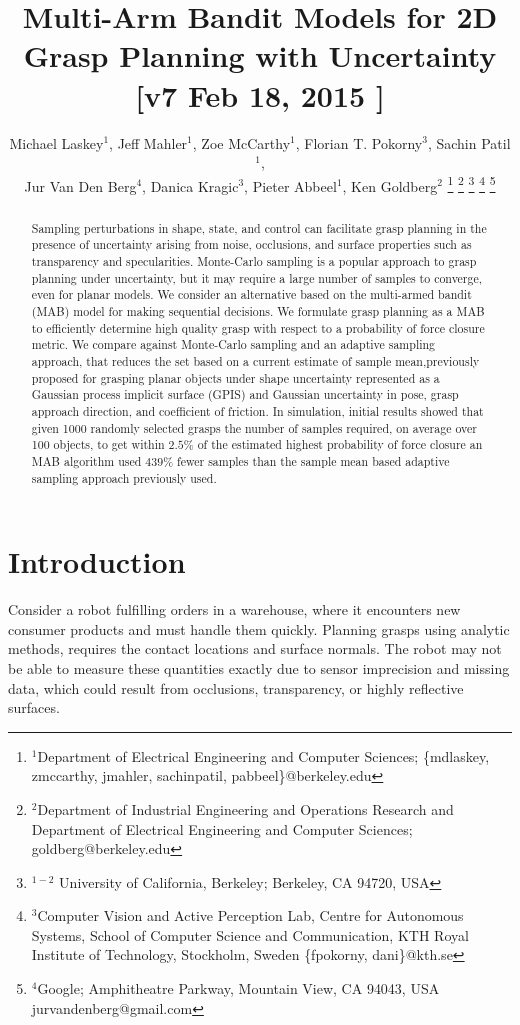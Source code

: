 \documentclass[10pt, conference]{ieeeconf}      %
\title{\LARGE \bf
Multi-Arm Bandit Models for 2D Grasp Planning with Uncertainty  [v7 Feb 18, 2015 ] }
\author{Michael Laskey$^1$, Jeff Mahler$^1$, Zoe McCarthy$^1$,  Florian T. Pokorny$^3$, Sachin Patil$^1$,\\ Jur Van Den Berg$^4$,  Danica Kragic$^3$, Pieter Abbeel$^1$, Ken Goldberg$^2$%
\thanks{$^1$Department of Electrical Engineering and Computer Sciences; {\small \{mdlaskey, zmccarthy, jmahler, sachinpatil, pabbeel\}@berkeley.edu}}%
\thanks{$^2$Department of Industrial Engineering and Operations Research and Department of Electrical Engineering and Computer Sciences; {\small goldberg@berkeley.edu}}%
\thanks{$^{1-2}$ University of California, Berkeley;  Berkeley, CA 94720, USA}%
\thanks{$^3$Computer Vision and Active Perception Lab, Centre for Autonomous Systems, School of Computer Science and Communication, KTH Royal Institute of Technology, Stockholm, Sweden {\small \{fpokorny, dani\}@kth.se}}%
\thanks{$^4$Google; Amphitheatre Parkway, Mountain View, CA 94043, USA {\small jurvandenberg@gmail.com}}%
}
\begin{document}
\maketitle
\thispagestyle{empty}
\pagestyle{empty}



\begin{abstract}
Sampling perturbations in shape, state, and control can facilitate grasp planning in the presence of uncertainty arising from noise, occlusions, and surface properties such as transparency and specularities. 
Monte-Carlo sampling is a popular approach to grasp planning under uncertainty, but it may require a large number of samples to converge, even for planar models.
We consider an alternative based on the multi-armed bandit (MAB) model for making sequential decisions.
We formulate grasp planning as a MAB  to efficiently determine high quality grasp with respect to a probability of force closure metric.
We compare against Monte-Carlo sampling and an adaptive sampling approach, that reduces the set based on a current estimate of sample mean,previously proposed for grasping planar objects under shape uncertainty represented as a Gaussian process implicit surface (GPIS) and Gaussian uncertainty in pose, grasp approach direction, and coefficient of friction.
In simulation, initial results  showed that given 1000 randomly selected grasps the number of samples required, on average over 100 objects, to get within $2.5\%$ of the estimated highest probability of force closure an MAB algorithm used $439\%$ fewer samples than the sample mean based adaptive sampling approach previously used.
\end{abstract}



\section{Introduction}



Consider a robot fulfilling orders in a warehouse, where it encounters new consumer products and must handle them quickly. Planning grasps using analytic methods, requires the contact locations and surface normals. The robot may not be able to measure these quantities exactly due to sensor imprecision and missing data, which could result from occlusions, transparency, or highly reflective surfaces. 
\end{document}
